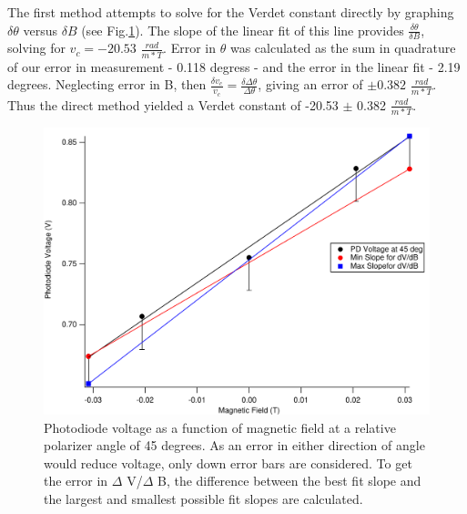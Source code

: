 \documentclass[prb,preprint]{revtex4-1}
\begin{document}
The first method attempts to solve for the Verdet constant directly by graphing $\delta \theta$ versus $\delta B$ (see Fig.\ref{V_B Slope}). The slope of the linear fit of this line provides $\frac{\delta \theta}{\delta B}$, solving for $v_c = -20.53$ $\frac{rad}{m*T}$. Error in $\theta$ was calculated as the sum in quadrature of our error in measurement - 0.118 degress - and the error in the linear fit - 2.19 degrees. Neglecting error in B, then $\frac{\delta v_c}{v_c} = \frac{\delta \Delta \theta}{\Delta \theta}$, giving an error of $\pm 0.382$ $\frac{rad}{m*T}$. Thus the direct method yielded a Verdet constant of -20.53 $\pm$ 0.382 $\frac{rad}{m*T}$.

\begin{figure}[h]

\includegraphics[width=180mm]{V_B_Slope.pdf}
\caption{\label{V_B Slope}Photodiode voltage as a function of magnetic field at a relative polarizer angle of 45 degrees. As an error in either direction of angle would reduce voltage, only down error bars are considered. To get the error in $\Delta$ V/$\Delta$ B, the difference between the best fit slope and the largest and smallest possible fit slopes are calculated.}
\end{figure}
\end{document}

